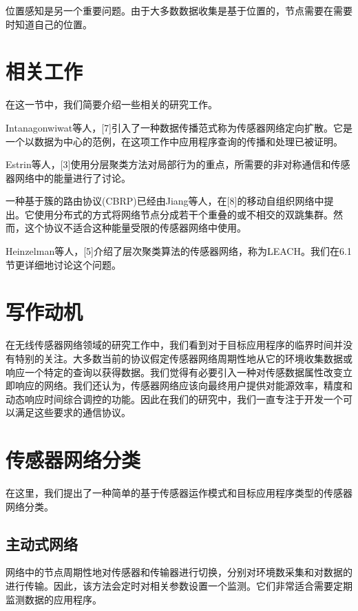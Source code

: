 \documentclass[journal]{IEEEtran}
\begin{document}
\begin{CJK}{UTF8}{gbsn}
位置感知是另一个重要问题。由于大多数数据收集是基于位置的，节点需要在需要时知道自己的位置。


\section{\textbf{相关工作}}


在这一节中，我们简要介绍一些相关的研究工作。

Intanagonwiwat等人，[7]引入了一种数据传播范式称为传感器网络定向扩散。它是一个以数据为中心的范例，在这项工作中应用程序查询的传播和处理已被证明。


Estrin等人，[3]使用分层聚类方法对局部行为的重点，所需要的非对称通信和传感器网络中的能量进行了讨论。

一种基于簇的路由协议(CBRP)已经由Jiang等人，在[8]的移动自组织网络中提出。它使用分布式的方式将网络节点分成若干个重叠的或不相交的双跳集群。然而，这个协议不适合这种能量受限的传感器网络中使用。

Heinzelman等人，[5]介绍了层次聚类算法的传感器网络，称为LEACH。我们在6.1节更详细地讨论这个问题。


\section{\textbf{写作动机\\ }}

在无线传感器网络领域的研究工作中，我们看到对于目标应用程序的临界时间并没有特别的关注。大多数当前的协议假定传感器网络周期性地从它的环境收集数据或响应一个特定的查询以获得数据。我们觉得有必要引入一种对传感数据属性改变立即响应的网络。我们还认为，传感器网络应该向最终用户提供对能源效率，精度和动态响应时间综合调控的功能。因此在我们的研究中，我们一直专注于开发一个可以满足这些要求的通信协议。


\section{\textbf{传感器网络分类}}

在这里，我们提出了一种简单的基于传感器运作模式和目标应用程序类型的传感器网络分类。


\subsection{\textbf{主动式网络}}

网络中的节点周期性地对传感器和传输器进行切换，分别对环境数采集和对数据的进行传输。因此，该方法会定时对相关参数设置一个监测。它们非常适合需要定期监测数据的应用程序。


\end{CJK}
\end{document}
